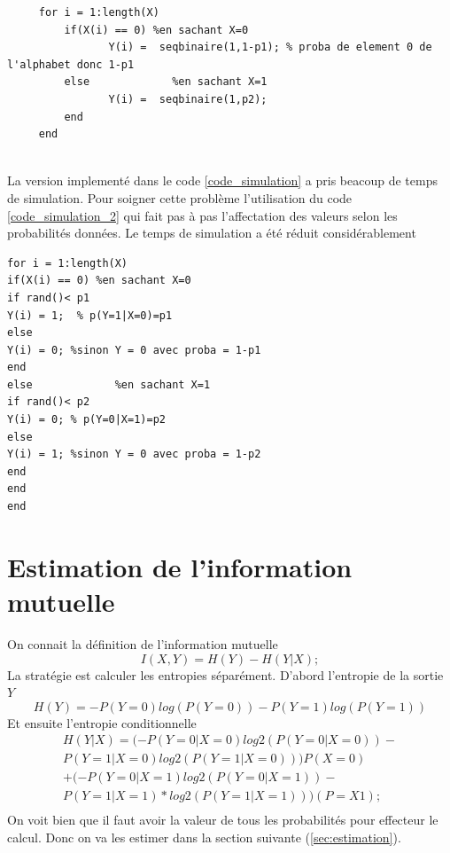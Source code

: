 \documentclass{report}
\begin{document}
\begin{lstlisting}[caption={Code pour les probabilite de transition $P(Y = 1|X = 0)=p1$ $ P(Y = 0|X = 1)=p2 $},label=code_simulation]
%% version en utilisant meme function seqbinaire
     for i = 1:length(X)
         if(X(i) == 0) %en sachant X=0
                Y(i) =  seqbinaire(1,1-p1); % proba de element 0 de l'alphabet donc 1-p1
         else             %en sachant X=1
                Y(i) =  seqbinaire(1,p2);
         end  
     end
 
\end{lstlisting}

La version implementé dans le code \ref{code_simulation} a pris beacoup de temps de simulation. Pour 
soigner cette problème l'utilisation du code \ref{code_simulation_2} qui fait pas à pas l'affectation
des valeurs selon les probabilités données. Le temps de simulation a été réduit considérablement

\begin{lstlisting}[caption={Code },label=code_simulation_2]
    for i = 1:length(X)
if(X(i) == 0) %en sachant X=0
if rand()< p1 
Y(i) = 1;  % p(Y=1|X=0)=p1
else              
Y(i) = 0; %sinon Y = 0 avec proba = 1-p1
end
else             %en sachant X=1
if rand()< p2
Y(i) = 0; % p(Y=0|X=1)=p2
else
Y(i) = 1; %sinon Y = 0 avec proba = 1-p2
end      
end
end
\end{lstlisting}

\section{Estimation de l'information mutuelle}
On connait la définition de l'information mutuelle
\begin{equation}\label{eq:I}
I(X,Y) = H(Y) - H(Y|X);
\end{equation}
La stratégie est calculer les entropies séparément. D'abord l'entropie de la sortie $Y$
\begin{equation}\label{eq:II}
H(Y) = -P(Y=0)log(P(Y=0))-P(Y=1)log(P(Y=1))
\end{equation}
Et ensuite l'entropie conditionnelle
\begin{eqnarray}\label{key}
H(Y|X)= (-P(Y=0|X=0)log2(P(Y=0|X=0))-\nonumber\\P(Y=1|X=0)log2(P(Y=1|X=0)))P(X=0)\nonumber\\ +(-P(Y=0|X=1)log2(P(Y=0|X=1))-\nonumber\\P(Y=1|X=1)*log2(P(Y=1|X=1)))(P=X1);\nonumber\\
\label{eq:III}
\end{eqnarray}
On voit bien que il faut avoir la valeur de tous les probabilités pour effecteur le calcul. Donc on va les estimer dans la section suivante (\ref{sec:estimation}).
\end{document}
